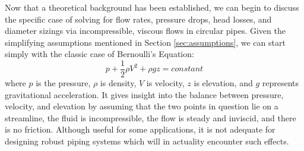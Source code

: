 \documentclass[9pt]{article} %
\numberwithin{equation}{section} %
\begin{document}
\begin{multicols}{2}
Now that a theoretical background has been established, we can begin to discuss the specific case of solving for flow rates, pressure drops, head losses, and diameter sizings via incompressible, viscous flows in circular pipes. Given the simplifying assumptions mentioned in Section \ref{sec:assumptions}, we can start simply with the classic case of Bernoulli's Equation:
\begin{equation} \label{eq:bernoulli}
p + \frac{1}{2} \rho V^{2} + \rho g z = constant
\end{equation}
where $p$ is the pressure, $\rho$ is density, $V$ is velocity, $z$ is elevation, and $g$ represents gravitational acceleration. It gives insight into the balance between pressure, velocity, and elevation by assuming that the two points in question lie on a streamline, the fluid is incompressible, the flow is steady and inviscid, and there is no friction. Although useful for some applications, it is not adequate for designing robust piping systems which will in actuality encounter such effects.


\end{multicols}
\end{document}
